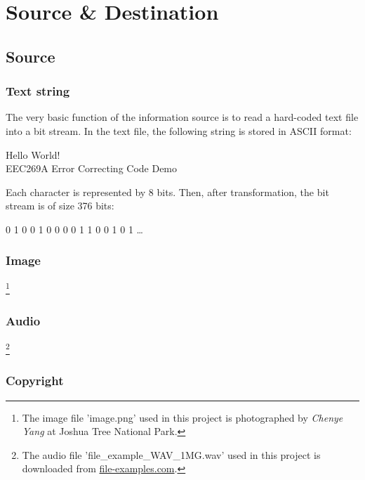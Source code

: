 \documentclass{article}
\begin{document}
\section{Source \& Destination}
\subsection{Source}

\subsubsection{Text string}
The very basic function of the information source is to read a hard-coded text file into a bit stream. 
In the text file, the following string is stored in ASCII format:
\begin{center}
    Hello World!\\EEC269A Error Correcting Code Demo
\end{center}
Each character is represented by 8 bits. Then, after transformation, the bit stream is of size 376 bits: 
\begin{center}
    0 1 0 0 1 0 0 0 0 1 1 0 0 1 0 1 \dots
\end{center}


\subsubsection{Image}
\footnote{The image file 'image.png' used in this project is photographed by \textit{Chenye Yang} at Joshua Tree National Park.}





\subsubsection{Audio}
\footnote{The audio file 'file\_example\_WAV\_1MG.wav' used in this project is downloaded from \href{https://file-examples.com/index.php/sample-audio-files/sample-wav-download/}{file-examples.com}.}



\subsubsection{Copyright}
\end{document}
